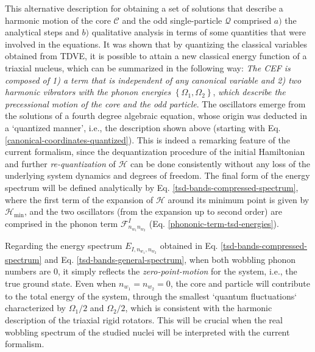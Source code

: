 This alternative description for obtaining a set of solutions that describe a harmonic motion of the core $\mathscr{C}$ and the odd single-particle $\mathcal{Q}$ comprised $a)$ the analytical steps and $b)$ qualitative analysis in terms of some quantities that were involved in the equations. It was shown that by quantizing the classical variables obtained from TDVE, it is possible to attain a new classical energy function of a triaxial nucleus, which can be summarized in the following way: \emph{The CEF is composed of 1) a term that is independent of any canonical variable and 2) two harmonic vibrators with the phonon energies} $\left\{\Omega_1,\Omega_2\right\}$, \emph{which describe the precessional motion of the core and the odd particle}. The oscillators emerge from the solutions of a fourth degree algebraic equation, whose origin was deducted in a `quantized manner', i.e., the description shown above (starting with Eq. \ref{canonical-coordinates-quantized}). This is indeed a remarking feature of the current formalism, since the dequantization procedure of the initial Hamiltonian and further \emph{re-quantization} of $\mathcal{H}$ can be done consistently without any loss of the underlying system dynamics and degrees of freedom. The final form of the energy spectrum will be defined analytically by Eq. \ref{tsd-bands-compressed-spectrum}, where the first term of the expansion of $\mathcal{H}$ around its minimum point is given by $\mathcal{H}_\text{min}$, and the two oscillators (from the expansion up to second order) are comprised in the phonon term $\mathcal{F}_{n_{w_1}n_{w_2}}^I$ (Eq. \ref{phononic-term-tsd-energies}).

Regarding the energy spectrum $E_{I,n_{w_1},n_{w_2}}$ obtained in Eq. \ref{tsd-bands-compressed-spectrum} and Eq. \ref{tsd-bands-general-spectrum}, when both wobbling phonon numbers are $0$, it simply reflects the \emph{zero-point-motion} for the system, i.e., the true ground state. Even when $n_{w_1}=n_{w_2}=0$, the core and particle will contribute to the total energy of the system, through the smallest `quantum fluctuations` characterized by $\Omega_1/2$ and $\Omega_2/2$, which is consistent with the harmonic description of the triaxial rigid rotators. This will be crucial when the real wobbling spectrum of the studied nuclei will be interpreted with the current formalism.
